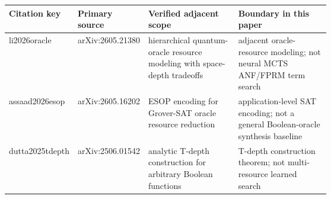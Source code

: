 \begin{tabularx}{\linewidth}{>{\raggedright\arraybackslash}p{0.18\linewidth}>{\raggedright\arraybackslash}p{0.17\linewidth}>{\raggedright\arraybackslash}p{0.28\linewidth}>{\raggedright\arraybackslash}X}
\toprule
Citation key & Primary source & Verified adjacent scope & Boundary in this paper \\
\midrule
li2026oracle & arXiv:2605.21380 & hierarchical quantum-oracle resource modeling with space-depth tradeoffs & adjacent oracle-resource modeling; not neural MCTS ANF/FPRM term search \\
assaad2026esop & arXiv:2605.16202 & ESOP encoding for Grover-SAT oracle resource reduction & application-level SAT encoding; not a general Boolean-oracle synthesis baseline \\
dutta2025tdepth & arXiv:2506.01542 & analytic T-depth construction for arbitrary Boolean functions & T-depth construction theorem; not multi-resource learned search \\
\bottomrule
\end{tabularx}
